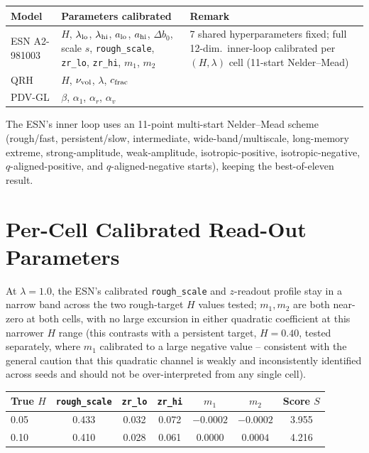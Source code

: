 \documentclass[11pt,a4paper]{article}
\begin{document}
\begin{center}\renewcommand{\arraystretch}{1.3}
\begin{tabular}{@{}p{3.0cm}p{6.4cm}p{5.0cm}@{}}\toprule
Model & Parameters calibrated & Remark \\\midrule
ESN A2-981003 & $H$, $\lambda_{\rm lo}$, $\lambda_{\rm hi}$, $a_{\rm lo}$,
  $a_{\rm hi}$, $\Delta b_0$, scale $s$, \texttt{rough\_scale},
  \texttt{zr\_lo}, \texttt{zr\_hi}, $m_1$, $m_2$ &
  7 shared hyperparameters fixed; full 12-dim.\ inner-loop calibrated
  per $(H,\lambda)$ cell (11-start Nelder--Mead) \\
QRH & $H$, $\nu_{\rm vol}$, $\lambda$, $c_{\rm frac}$ & \\
PDV-GL & $\beta$, $\alpha_1$, $\alpha_r$, $\alpha_v$ & \\
\bottomrule\end{tabular}\end{center}
The ESN's inner loop uses an 11-point multi-start Nelder--Mead scheme
(rough/fast, persistent/slow, intermediate, wide-band/multiscale,
long-memory extreme, strong-amplitude, weak-amplitude,
isotropic-positive, isotropic-negative, $q$-aligned-positive, and
$q$-aligned-negative starts), keeping the best-of-eleven result.
\section{Per-Cell Calibrated Read-Out Parameters}
At $\lambda=1.0$, the ESN's calibrated \texttt{rough\_scale} and
$z$-readout profile stay in a narrow band across the two rough-target
$H$ values tested; $m_1,m_2$ are both near-zero at both cells, with no
large excursion in either quadratic coefficient at this narrower $H$
range (this contrasts with a persistent target, $H=0.40$, tested
separately, where $m_1$ calibrated to a large negative value --
consistent with the general caution that this quadratic channel is
weakly and inconsistently identified across seeds and should not be
over-interpreted from any single cell).
\begin{center}\renewcommand{\arraystretch}{1.3}
\begin{tabular}{@{}lcccccc@{}}\toprule
True $H$ & \texttt{rough\_scale} & \texttt{zr\_lo} & \texttt{zr\_hi} & $m_1$ & $m_2$ & Score $S$ \\\midrule
0.05 & 0.433 & 0.032 & 0.072 & $-0.0002$ & $-0.0002$ & 3.955 \\
0.10 & 0.410 & 0.028 & 0.061 & $0.0000$ & $0.0004$ & 4.216 \\
\bottomrule\end{tabular}\end{center}
\end{document}
